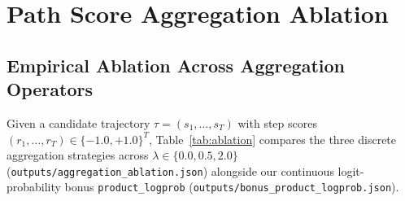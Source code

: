 \documentclass[10pt,a4paper]{article}
\begin{document}
\begin{table}[h!]
\centering
\caption{Paired win/loss breakdown comparing PRM Best-of-5 (\texttt{min}) against Self-Consistency baselines across all 50 problems.}
\label{tab:paired}
\end{table}

\section{Path Score Aggregation Ablation}

\subsection{Empirical Ablation Across Aggregation Operators}
Given a candidate trajectory $\tau = (s_1, \dots, s_T)$ with step scores $(r_1, \dots, r_T) \in \{-1.0, +1.0\}^T$, Table~\ref{tab:ablation} compares the three discrete aggregation strategies across $\lambda \in \{0.0, 0.5, 2.0\}$ (\texttt{outputs/aggregation\_ablation.json}) alongside our continuous logit-probability bonus \texttt{product\_logprob} (\texttt{outputs/bonus\_product\_logprob.json}).
\end{document}
